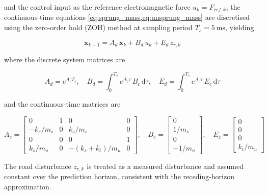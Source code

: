 and the control input as the reference electromagnetic force
$u_k = F_{ref,k}$, the continuous-time equations
\cref{eq:sprung_mass,eq:unsprung_mass} are discretised using the
zero-order hold (ZOH) method at sampling period $T_s = \SI{5}{\milli\second}$,
yielding

\begin{equation}
    \bm{x}_{k+1} = A_d\,\bm{x}_k + B_d\,u_k + E_d\,z_{r,k}
    \label{eq:mpc_discrete}
\end{equation}

where the discrete system matrices are

\begin{equation}
    A_d = e^{A_c T_s}, \quad
    B_d = \int_0^{T_s} e^{A_c \tau}\,B_c\,\mathrm{d}\tau, \quad
    E_d = \int_0^{T_s} e^{A_c \tau}\,E_c\,\mathrm{d}\tau
    \label{eq:zoh}
\end{equation}

and the continuous-time matrices are

\begin{equation}
    A_c =
    \begin{bmatrix}
        0 & 1 & 0 & 0 \\
        -k_s/m_s & 0 & k_s/m_s & 0 \\
        0 & 0 & 0 & 1 \\
        k_s/m_u & 0 & -(k_s+k_t)/m_u & 0
    \end{bmatrix}, \quad
    B_c =
    \begin{bmatrix}
        0 \\ 1/m_s \\ 0 \\ -1/m_u
    \end{bmatrix}, \quad
    E_c =
    \begin{bmatrix}
        0 \\ 0 \\ 0 \\ k_t/m_u
    \end{bmatrix}
    \label{eq:continuous_matrices}
\end{equation}

The road disturbance $z_{r,k}$ is treated as a measured disturbance
and assumed constant over the prediction horizon, consistent with the
receding-horizon approximation.

